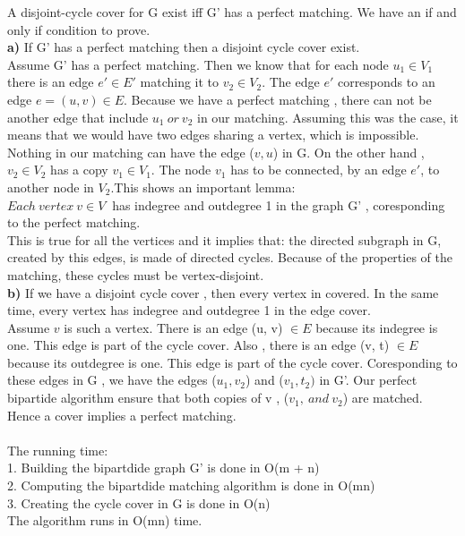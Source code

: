 \documentclass[11pt]{article}
\begin{document}
\claim  A disjoint-cycle cover for G exist iff G' has a perfect matching.
\proof We have an if and only if condition to prove. \\
\textbf{a)} If G' has a perfect matching then a disjoint cycle cover exist.\\
Assume G' has a perfect matching. Then we know that for each node $u_1 \in V_1$ there is an edge $e' \in E'$  matching it to $v_2 \in V_2$. The edge $e'$ corresponds to an edge $e = (u,v) \in E$. Because we have a perfect matching , there can not be another edge that include $u_1 \ or \ v_2$ in our matching. Assuming this was the case, it means that we would have two edges sharing a vertex, which is impossible. Nothing in our matching can have the edge ($v, u$) in G.  On the other hand , $v_2 \in V_2$ has a copy $v_1 \in V_1$. The node $v_1$ has to be connected, by an edge $e'$, to another node in $V_2$.This shows an important lemma: \\
$Each \ vertex \ v \in V \ $  has indegree and outdegree 1 in the graph G' , coresponding to the perfect matching. \\
This is true for all the vertices and it implies that: the directed subgraph in G, created by this edges, is made of directed cycles. Because of the properties of the matching, these cycles must be vertex-disjoint. \\
\textbf{b)} If we have a disjoint cycle cover , then every vertex in covered. In the same time, every vertex has indegree and outdegree 1 in the edge cover. \\
Assume $v$ is such a vertex. There is an edge (u, v) $\in E$ because its indegree is one. This edge is part of the cycle cover. Also , there is an edge (v, t) $\in E$ because its outdegree is one. This edge is part of the cycle cover.  Coresponding to these edges in G , we have the edges ($u_1, v_2$) and ($v_1, t_2)$ in G'. Our perfect bipartide algorithm ensure that both copies of v , ($v_1, \ and \ v_2 $) are matched. Hence a cover implies a perfect matching. \\ \\

The running time:\\
1. Building the bipartdide graph G' is done in O(m + n)\\
2. Computing the bipartdide matching algorithm is done in O(mn)\\
3. Creating the cycle cover in G is done in O(n)\\
The algorithm runs in O(mn) time. 
 
\end{document}
